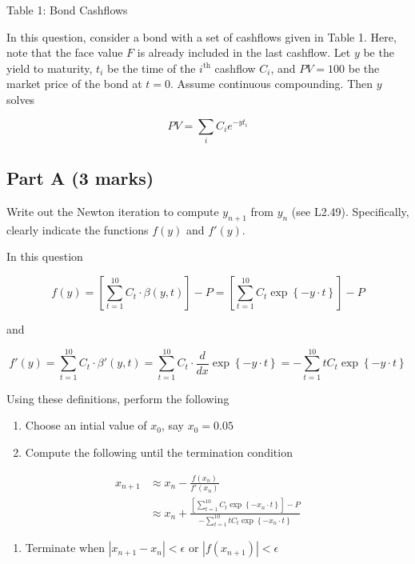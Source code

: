 \documentclass[11pt]{article}
\providecommand{\tightlist}{%
      \setlength{\itemsep}{0pt}\setlength{\parskip}{0pt}}
\begin{document}
Table 1: Bond Cashflows

In this question, consider a bond with a set of cashflows given in Table
1. Here, note that the face value \(F\) is already included in the last
cashflow. Let \(y\) be the yield to maturity, \(t_i\) be the time of the
\(i^{\text{th}}\) cashflow \(C_i\), and \(PV = 100\) be the market price
of the bond at \(t = 0\). Assume continuous compounding. Then \(y\)
solves

\[PV = \sum_{i} C_i e^{-y t_i}\]

    \subsection{Part A (3 marks)}\label{part-a-3-marks}

Write out the Newton iteration to compute \(y_{n+1}\) from \(y_n\) (see
L2.49). Specifically, clearly indicate the functions \(f(y)\) and
\(f'(y)\).

    In this question

\[f(y) = \left[\sum_{t=1}^{10} C_t \cdot \beta(y, t)\right] - P = \left[\sum_{t=1}^{10}C_t \exp\left\{-y \cdot t\right\}\right] - P\]

and

\[f'(y) = \sum_{t=1}^{10} C_t \cdot \beta'(y, t) = \sum_{t=1}^{10} C_t \cdot \frac{d}{dx}\exp\left\{-y \cdot t\right\} = - \sum_{t=1}^{10}t C_t \exp\left\{-y \cdot t\right\}\]

Using these definitions, perform the following

\begin{enumerate}
\def\labelenumi{\arabic{enumi}.}
\tightlist
\item
  Choose an intial value of \(x_0\), say \(x_0 = 0.05\)
\item
  Compute the following until the termination condition
\end{enumerate}

\begin{align}
    x_{n+1} &\approx x_n - \frac{f(x_n)}{f'(x_n)} \\
    &\approx x_n + \frac{\left[\sum_{t=1}^{10}C_t \exp\left\{-x_n \cdot t\right\}\right] - P}{- \sum_{t=1}^{10}t C_t \exp\left\{-x_n \cdot t\right\}}
\end{align}

\begin{enumerate}
\def\labelenumi{\arabic{enumi}.}
\setcounter{enumi}{2}
\tightlist
\item
  Terminate when \(|x_{n+1} - x_{n}| < \epsilon\) or
  \(|f(x_{n+1})| < \epsilon\)
\end{enumerate}
\end{document}
